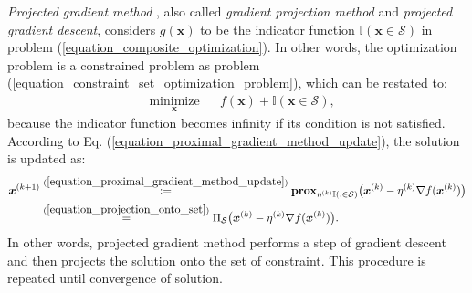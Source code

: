 \documentclass[lang=cn,10pt]{gorgeousnbook}
\numberwithin{equation}{section}%
\numberwithin{figure}{section}%
\begin{document}
\textit{Projected gradient method} \cite{iusem2003convergence}, also called \textit{gradient projection method} and \textit{projected gradient descent}, considers $g(\boldsymbol{x})$ to be the indicator function $\mathbb{I}(\boldsymbol{x} \in \mathcal{S})$ in problem (\ref{equation_composite_optimization}). In other words, the optimization problem is a constrained problem as problem (\ref{equation_constraint_set_optimization_problem}), which can be restated to:
\begin{equation}\label{equation_constraint_set_optimization_problem_withIndicator}
\begin{aligned}
& \underset{\boldsymbol{x}}{\text{minimize}}
& & f(\boldsymbol{x}) + \mathbb{I}(\boldsymbol{x} \in \mathcal{S}),
\end{aligned}
\end{equation}
because the indicator function becomes infinity if its condition is not satisfied. 
According to Eq. (\ref{equation_proximal_gradient_method_update}), the solution is updated as:
\begin{align}
\boldsymbol{x}^{(k+1)} & \overset{(\ref{equation_proximal_gradient_method_update})}{:=} \textbf{prox}_{\eta^{(k)} \mathbb{I}(. \in \mathcal{S})}\big(\boldsymbol{x}^{(k)} - \eta^{(k)} \nabla f(\boldsymbol{x}^{(k)})\big) \nonumber\\
&\overset{(\ref{equation_projection_onto_set})}{=} \Pi_{\mathcal{S}}\big(\boldsymbol{x}^{(k)} - \eta^{(k)} \nabla f(\boldsymbol{x}^{(k)})\big). \label{equation_projected_gradient_method_update}
\end{align}
In other words, projected gradient method performs a step of gradient descent and then projects the solution onto the set of constraint. This procedure is repeated until convergence of solution. 
\end{document}
